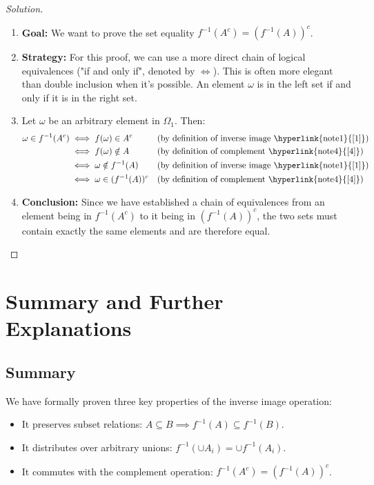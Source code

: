 \documentclass[11pt,a4paper]{article}
\newenvironment{solution}{\begin{proof}[Solution]}{\end{proof}}
\begin{document}
\begin{solution}
\begin{enumerate}
    \item \textbf{Goal:} We want to prove the set equality $f^{-1}(A^c) = (f^{-1}(A))^c$.

    \item \textbf{Strategy:} For this proof, we can use a more direct chain of logical equivalences ("if and only if", denoted by $\iff$). This is often more elegant than double inclusion when it's possible. An element $\omega$ is in the left set if and only if it is in the right set.

    \item Let $\omega$ be an arbitrary element in $\Omega_1$. Then:
    \begin{align*}
        \omega \in f^{-1}(A^c)
        &\iff f(\omega) \in A^c && \text{(by definition of inverse image \hyperlink{note1}{[1]})} \\
        &\iff f(\omega) \notin A && \text{(by definition of complement \hyperlink{note4}{[4]})} \\
        &\iff \omega \notin f^{-1}(A) && \text{(by definition of inverse image \hyperlink{note1}{[1]})} \\
        &\iff \omega \in (f^{-1}(A))^c && \text{(by definition of complement \hyperlink{note4}{[4]})}
    \end{align*}

    \item \textbf{Conclusion:} Since we have established a chain of equivalences from an element being in $f^{-1}(A^c)$ to it being in $(f^{-1}(A))^c$, the two sets must contain exactly the same elements and are therefore equal.
\end{enumerate}
\end{solution}

\newpage
\section*{Summary and Further Explanations}

\subsection*{Summary}

We have formally proven three key properties of the inverse image operation:
\begin{itemize}
    \item It preserves subset relations: $A \subseteq B \implies f^{-1}(A) \subseteq f^{-1}(B)$.
    \item It distributes over arbitrary unions: $f^{-1}(\cup A_i) = \cup f^{-1}(A_i)$.
    \item It commutes with the complement operation: $f^{-1}(A^c) = (f^{-1}(A))^c$.
\end{itemize}
\end{document}
